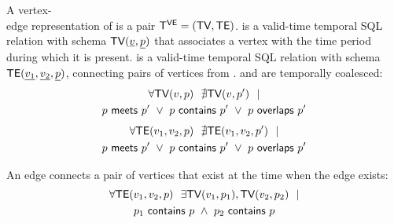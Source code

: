 
\vspace{-0.2cm}
\begin{definition}
A vertex-\\edge representation of \tg is a pair $\mathsf{T^{VE}}=(\textsf{TV}, \textsf{TE})$. \tv
is a valid-time temporal SQL relation with schema $\textsf{TV}(\underline{v},
\underline{p})$ that associates a vertex with the time period during
which it is present. \te is a valid-time temporal SQL relation with
schema $\textsf{TE}(\underline{v_1}, \underline{v_2}, \underline{p})$,
connecting pairs of vertices from \tv. \tv and \te are
temporally coalesced:
\begin{multline}
\forall \textsf{TV}(v, p)~~\nexists \textsf{TV}(v, p')~~| \\
                       p~\mathsf{meets}~p'~\lor~p~\mathsf{contains}~p'~\lor~p~\mathsf{overlaps}~p'
\label{def:tg:c2}
\end{multline}
\vspace{-0.5cm}
\begin{multline}
\forall \textsf{TE}(v_1, v_2, p)~~\nexists \textsf{TE}(v_1,v_2, p')~~| \\
                       p~\mathsf{meets}~p'~\lor~p~\mathsf{contains}~p'~\lor~p~\mathsf{overlaps}~p'
\label{def:tg:c3}
\end{multline}

An edge connects a pair of vertices that exist at the time when the edge exists:
\begin{multline}
\forall \textsf{TE}(v_1, v_2, p)~~\exists \textsf{TV}(v_1, p_1), \textsf{TV}(v_2, p_2)~~| \\
                       p_1~\mathsf{contains}~p~\wedge~p_2~\mathsf{contains}~p
\label{def:tg:c1}
\end{multline}
\vspace{-0.5cm}


\end{definition}
